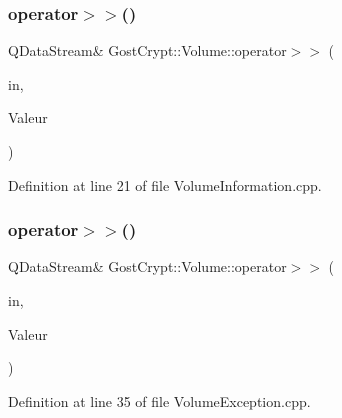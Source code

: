 \subsubsection{\texorpdfstring{operator$>$$>$()}{operator>>()}\hspace{0.1cm}{\footnotesize\ttfamily [1/19]}}
{\footnotesize\ttfamily Q\+Data\+Stream\& Gost\+Crypt\+::\+Volume\+::operator$>$$>$ (\begin{DoxyParamCaption}\item[{Q\+Data\+Stream \&}]{in,  }\item[{\hyperlink{struct_gost_crypt_1_1_volume_1_1_volume_information}{Volume\+Information} \&}]{Valeur }\end{DoxyParamCaption})}



Definition at line 21 of file Volume\+Information.\+cpp.

\mbox{\label{namespace_gost_crypt_1_1_volume_a6979dbb58485267dc0ad9d26c2f515f0}} 
\subsubsection{\texorpdfstring{operator$>$$>$()}{operator>>()}\hspace{0.1cm}{\footnotesize\ttfamily [2/19]}}
{\footnotesize\ttfamily Q\+Data\+Stream\& Gost\+Crypt\+::\+Volume\+::operator$>$$>$ (\begin{DoxyParamCaption}\item[{Q\+Data\+Stream \&}]{in,  }\item[{\hyperlink{class_gost_crypt_1_1_volume_1_1_volume_exception}{Gost\+Crypt\+::\+Volume\+::\+Volume\+Exception} \&}]{Valeur }\end{DoxyParamCaption})}



Definition at line 35 of file Volume\+Exception.\+cpp.

\mbox{\label{namespace_gost_crypt_1_1_volume_a0a4c69e94b20f187bcfa3cc5f38accba}} 

